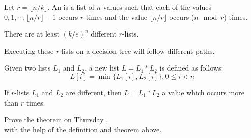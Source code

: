\begin{frame}{}
  \vspace{0.30cm}

  \begin{definition}[$r$-list]
    Let $r = \lfloor n/k \rfloor$.
    An  is a list of $n$ values such that
    each of the values $0, 1, \cdots, \lfloor n/r \rfloor - 1$ occurs $r$ times 
    and the value $\lfloor n/r \rfloor$ occurs ($n \mod r$) times.
  \end{definition}

  \begin{lemma}
    There are at least $(k/e)^{n}$ different $r$-lists.
  \end{lemma}

  \begin{theorem}
    Executing these $r$-lists on a decision tree will follow different paths.
  \end{theorem}
\end{frame}

\begin{frame}{}
  \vspace{0.30cm}

  \begin{definition}[$L = L_1 \ast L_2$]
    Given two lists $L_1$ and $L_2$, a new list $L = L_1 \ast L_2$ is defined as follows:
    \[
      L[i] = \min \big\{ L_1[i], L_2[i] \big\}, 0 \le i < n
    \]
  \end{definition}

  \begin{theorem}
    If $r$-lists $L_1$ and $L_2$ are different, then $L = L_1 \ast L_2$  a value which occurs more than $r$ times.
  \end{theorem}

  \begin{center}
    Prove the theorem on Thursday , \\
    with the help of the definition and theorem above.
  \end{center}
\end{frame}

